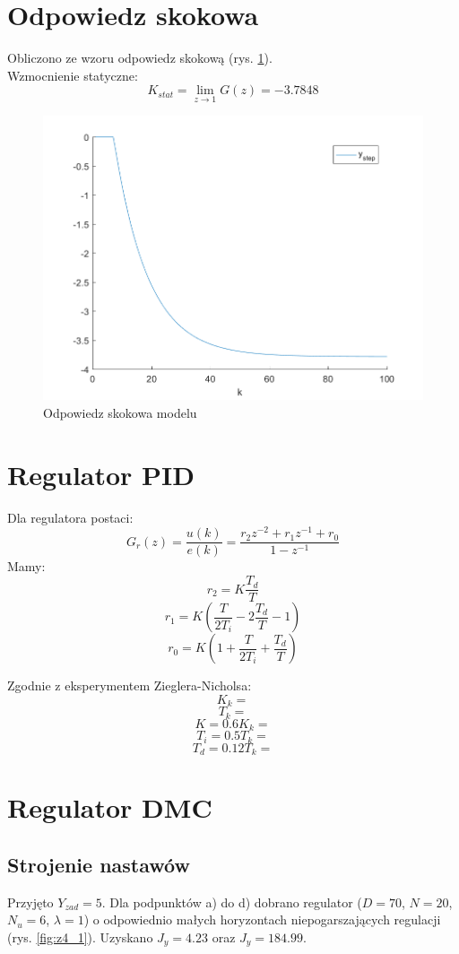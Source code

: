 \documentclass[a4paper, 10pt]{article}
\begin{document}
	\section{Odpowiedz skokowa}
	Obliczono ze wzoru odpowiedz skokową (rys. \ref{fig:z2}).\\
	Wzmocnienie statyczne:
	\[K_{stat}=\lim_{z\rightarrow 1}G(z)=-3.7848\]
	\begin{figure}[H]
		\centering
		\includegraphics[width=0.9\linewidth]{z2}
		\caption{Odpowiedz skokowa modelu}
		\label{fig:z2}
		\end{figure}
		
	\section{Regulator PID}
	Dla regulatora postaci:
	\[G_r(z)=\frac{u(k)}{e(k)} = \frac{r_2z^{-2}+r_1z^{-1}+r_0}{1-z^{-1}}\]
	Mamy:
	\[r_2=K\frac{T_d}{T}\]
	\[r_1=K(\frac{T}{2T_i}-2\frac{T_d}{T}-1)\]
	\[r_0=K(1+\frac{T}{2T_i}+\frac{T_d}{T})\]
	
	Zgodnie z eksperymentem Zieglera-Nicholsa:
	\[K_k = \]
	\[T_k = \]
	\[K = 0.6K_k = \]
	\[T_i = 0.5T_k = \]
	\[T_d = 0.12T_k = \]
	
	\section{Regulator DMC}
	\subsection{Strojenie nastawów}
	Przyjęto $Y_{zad}=5$. Dla podpunktów a) do d) dobrano regulator ($D=70$, $N=20$, $N_u=6$, $\lambda=1$) o odpowiednio małych horyzontach niepogarszających regulacji (rys. \ref{fig:z4_1}). Uzyskano $J_y=4.23$ oraz $J_y = 184.99$.
	
\end{document}
